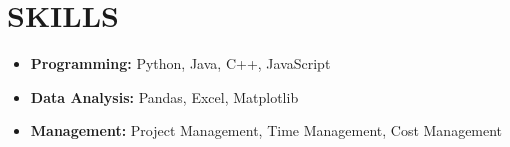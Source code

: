 \section*{SKILLS}
\noindent
\begin{itemize}
	\item \textbf{Programming:} Python, Java, C++, JavaScript
	\item \textbf{Data Analysis:} Pandas, Excel, Matplotlib
	\item \textbf{Management:} Project Management, Time Management, Cost Management
\end{itemize}
